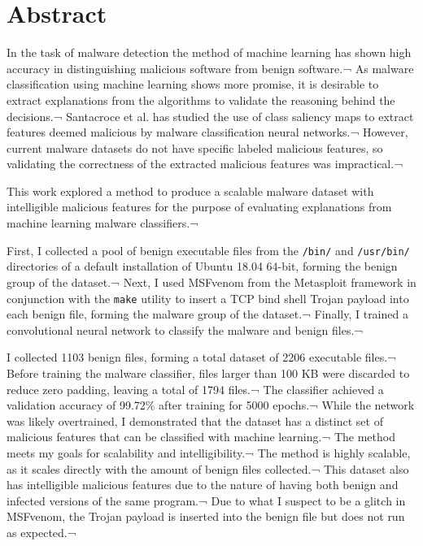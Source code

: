 \documentclass[12pt, letterpaper, titlepage]{article}
\newcommand{\ubu}{Ubuntu}
\newcommand{\ubuVer}{18.04 64-bit}
\newcommand{\metasploit}{Metasploit}
\newcommand{\msfv}{MSFvenom}
\newcommand{\payloadName}{TCP bind shell}
\newcommand{\benignFiles}{1103}
\newcommand{\totalFiles}{2206}
\newcommand{\usableFiles}{1794}
\newcommand{\maxFileSize}{100 KB}
\newcommand{\maxTrainingEpochs}{5000}
\newcommand{\testAccuracy}{99.72\%}
\begin{document}
\pagebreak

\tableofcontents
\listoffigures
\listoftables

\pagebreak

\section{Abstract}
\par In the task of malware detection the method of machine learning has shown high accuracy in distinguishing malicious software from benign software.¬
As malware classification using machine learning shows more promise, it is desirable to extract explanations from the algorithms to validate the reasoning behind the decisions.¬
Santacroce et al. \cite{SantacroceMaV, SantacroceSalience} has studied the use of class saliency maps to extract features deemed malicious by malware classification neural networks.¬
However, current malware datasets do not have specific labeled malicious features, so validating the correctness of the extracted malicious features was impractical.¬

\par This work explored a method to produce a scalable malware dataset with intelligible malicious features for the purpose of evaluating explanations from machine learning malware classifiers.¬

First, I collected a pool of benign executable files from the \verb|/bin/| and \verb|/usr/bin/| directories of a default installation of \ubu{} \ubuVer{}, forming the benign group of the dataset.¬
Next, I used \msfv{} from the \metasploit{} framework in conjunction with the \verb|make| utility to insert a \payloadName{} Trojan payload into each benign file, forming the malware group of the dataset.¬
Finally, I trained a convolutional neural network to classify the malware and benign files.¬

\par I collected \benignFiles{} benign files, forming a total dataset of \totalFiles{} executable files.¬
Before training the malware classifier, files larger than \maxFileSize{} were discarded to reduce zero padding, leaving a total of \usableFiles{} files.¬
The classifier achieved a validation accuracy of \testAccuracy{} after training for \maxTrainingEpochs{} epochs.¬
While the network was likely overtrained, I demonstrated that the dataset has a distinct set of malicious features that can be classified with machine learning.¬
The method meets my goals for scalability and intelligibility.¬
The method is highly scalable, as it scales directly with the amount of benign files collected.¬
This dataset also has intelligible malicious features due to the nature of having both benign and infected versions of the same program.¬
Due to what I suspect to be a glitch in \msfv{}, the Trojan payload is inserted into the benign file but does not run as expected.¬
\end{document}
